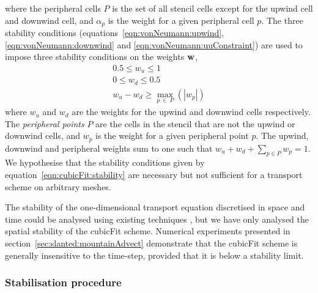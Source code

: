 where the peripheral cells $P$ is the set of all stencil cells except for the upwind cell and downwind cell, and $\alpha_p$ is the weight for a given peripheral cell $p$.
The three stability conditions (equations~\ref{eqn:vonNeumann:upwind}, \ref{eqn:vonNeumann:downwind} and \ref{eqn:vonNeumann:uuConstraint}) are used to impose three stability conditions on the weights $\mathbf{w}$,
\begin{subequations}
\label{eqn:cubicFit:stability}
\begin{align}
	0.5 \leq w_u \leq 1 \label{eqn:cubicFit:stabilityU} \\
	0 \leq w_d \leq 0.5 \label{eqn:cubicFit:stabilityD} \\
	w_u - w_d \geq \max_{p\:\in\:P}(|w_p|)
\end{align}
\end{subequations}
where $w_u$ and $w_d$ are the weights for the upwind and downwind cells respectively.  The \textit{peripheral points} $P$ are the cells in the stencil that are not the upwind or downwind cells, and $w_p$ is the weight for a given peripheral point $p$.
 The upwind, downwind and peripheral weights sum to one such that $w_u + w_d + \sum_{p \in P} w_p = 1$.
We hypothesise that the stability conditions given by equation~\eqref{eqn:cubicFit:stability} are necessary but not sufficient for a transport scheme on arbitrary meshes.

The stability of the one-dimensional transport equation discretised in space and time could be analysed using existing techniques \citep{baldauf2008}, but we have only analysed the spatial stability of the cubicFit scheme.  Numerical experiments presented in section~\ref{sec:slanted:mountainAdvect} demonstrate that the cubicFit scheme is generally insensitive to the time-step, provided that it is below a stability limit.

\subsubsection{Stabilisation procedure}

